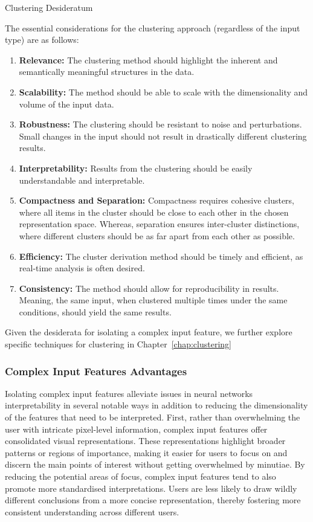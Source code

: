 \begin{Desideratum}{Clustering Desideratum}

The essential considerations for the clustering approach (regardless of the input type) are as follows:
\begin{enumerate}
    \item \textbf{Relevance:} The clustering method should  highlight the inherent and semantically meaningful structures in the data.
    \item \textbf{Scalability:} The method should be able to scale with the dimensionality and volume of the input data.
    \item \textbf{Robustness:} The clustering should be resistant to noise and perturbations. Small changes in the input should not result in drastically different clustering results.
    \item \textbf{Interpretability:} Results from the clustering should be easily understandable and interpretable.
    \item \textbf{Compactness and Separation:} Compactness requires cohesive clusters, where all items in the cluster should be close to each other in the chosen representation space. Whereas, separation ensures inter-cluster distinctions, where different clusters should be as far apart from each other as possible.
    \item \textbf{Efficiency:} The cluster derivation method should be timely and efficient, as real-time analysis is often desired.
    \item \textbf{Consistency:} The method should allow for reproducibility in results. Meaning, the same input, when clustered multiple times under the same conditions, should yield the same results.
    
\end{enumerate}  
\end{Desideratum}

Given the desiderata for isolating a complex input feature, we further explore specific techniques for clustering in Chapter~\ref{chap:clustering}

\subsubsection{Complex Input Features Advantages}

Isolating complex input features alleviate issues in neural networks interpretability in several notable ways in addition to reducing the dimensionality of the features that need to be interpreted. First, rather than overwhelming the user with intricate pixel-level information, complex input features offer consolidated visual representations. These representations highlight broader patterns or regions of importance, making it easier for users to focus on and discern the main points of interest without getting overwhelmed by minutiae. By reducing the potential areas of focus, complex input features tend to also promote more standardised interpretations. Users are less likely to draw wildly different conclusions from a more concise representation, thereby fostering more consistent understanding across different users.

